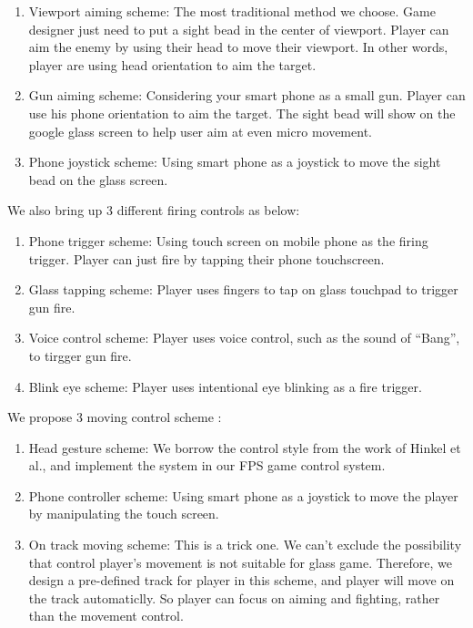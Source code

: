 \begin{enumerate}
\item Viewport aiming scheme: The most traditional method we choose. Game designer just need to put a sight bead in the center of viewport. Player can aim the enemy by using their head to move their viewport. In other words, player are using head orientation to aim the target.

\item Gun aiming scheme: Considering your smart phone as a small gun. Player can use his phone orientation to aim the target. The sight bead will show on the google glass screen to help user aim at even micro movement.

\item Phone joystick scheme: Using smart phone as a joystick to move the sight bead on the glass screen.
\end{enumerate}

We also bring up 3 different firing controls as below:

\begin{enumerate}
\item Phone trigger scheme: Using touch screen on mobile phone as the firing trigger. Player can just fire by tapping their phone touchscreen.

\item Glass tapping scheme: Player uses fingers to tap on glass touchpad to trigger gun fire.

\item Voice control scheme: Player uses voice control, such as the sound of ``Bang'', to tirgger gun fire.

\item Blink eye scheme: Player uses intentional eye blinking as a fire trigger.
\end{enumerate}

We propose 3 moving control scheme :

\begin{enumerate}
\item Head gesture scheme: We borrow the control style from the work of Hinkel et al.\cite{wheel}, and implement the system in our FPS game control system.

\item Phone controller scheme: Using smart phone as a joystick to move the player by manipulating the touch screen.

\item On track moving scheme: This is a trick one. We can't exclude the possibility that control player's movement is not suitable for glass game. Therefore, we design a pre-defined track for player in this scheme, and player will move on the track automaticlly. So player can focus on aiming and fighting, rather than the movement control.
\end{enumerate}

